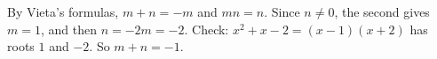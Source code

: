 By Vieta's formulas, $m+n=-m$ and $mn=n$. Since $n\ne0$, the second gives $m=1$, and then $n=-2m=-2$. Check: $x^2+x-2=(x-1)(x+2)$ has roots $1$ and $-2$. So $m+n=\boxed{-1}$.
